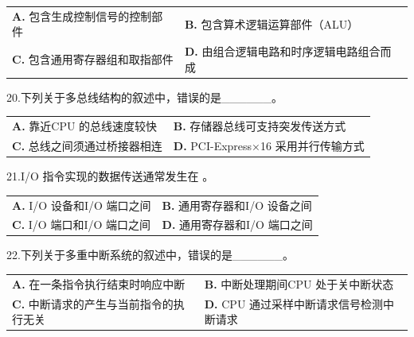 \documentclass[UTF8,11pt]{ctexart}
\begin{document}
\begin{center}\begin{tabular}{>{\raggedright\arraybackslash}p{\dimexpr(\linewidth-4\tabcolsep)/2\relax}>{\raggedright\arraybackslash}p{\dimexpr(\linewidth-4\tabcolsep)/2\relax}}
\textbf{A.} 包含生成控制信号的控制部件 & \textbf{B.} 包含算术逻辑运算部件（ALU）\\[.35em]
\textbf{C.} 包含通用寄存器组和取指部件 & \textbf{D.} 由组合逻辑电路和时序逻辑电路组合而成\\[.35em]\end{tabular}\end{center}

20.下列关于多总线结构的叙述中，错误的是\_\_\_\_\_\_。


\begin{center}\begin{tabular}{>{\raggedright\arraybackslash}p{\dimexpr(\linewidth-4\tabcolsep)/2\relax}>{\raggedright\arraybackslash}p{\dimexpr(\linewidth-4\tabcolsep)/2\relax}}
\textbf{A.} 靠近CPU 的总线速度较快 & \textbf{B.} 存储器总线可支持突发传送方式\\[.35em]
\textbf{C.} 总线之间须通过桥接器相连 & \textbf{D.} PCI-Express×16 采用并行传输方式\\[.35em]\end{tabular}\end{center}

21.I/O 指令实现的数据传送通常发生在 。


\begin{center}\begin{tabular}{>{\raggedright\arraybackslash}p{\dimexpr(\linewidth-4\tabcolsep)/2\relax}>{\raggedright\arraybackslash}p{\dimexpr(\linewidth-4\tabcolsep)/2\relax}}
\textbf{A.} I/O 设备和I/O 端口之间 & \textbf{B.} 通用寄存器和I/O 设备之间\\[.35em]
\textbf{C.} I/O 端口和I/O 端口之间 & \textbf{D.} 通用寄存器和I/O 端口之间\\[.35em]\end{tabular}\end{center}

22.下列关于多重中断系统的叙述中，错误的是\_\_\_\_\_\_。


\begin{center}\begin{tabular}{>{\raggedright\arraybackslash}p{\dimexpr(\linewidth-4\tabcolsep)/2\relax}>{\raggedright\arraybackslash}p{\dimexpr(\linewidth-4\tabcolsep)/2\relax}}
\textbf{A.} 在一条指令执行结束时响应中断 & \textbf{B.} 中断处理期间CPU 处于关中断状态\\[.35em]
\textbf{C.} 中断请求的产生与当前指令的执行无关 & \textbf{D.} CPU 通过采样中断请求信号检测中断请求\\[.35em]\end{tabular}\end{center}
\end{document}
